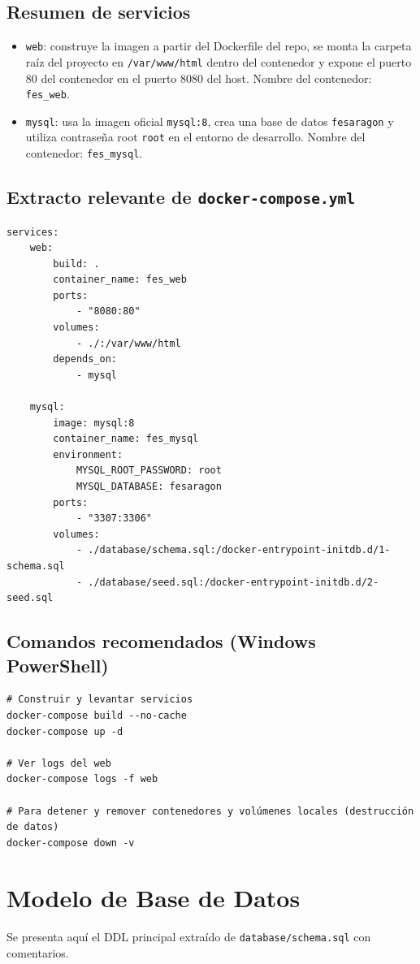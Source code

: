 \documentclass[12pt,letterpaper,oneside]{extreport}
\begin{document}
\section{Resumen de servicios}
\begin{itemize}
    \item \texttt{web}: construye la imagen a partir del Dockerfile del repo, se monta la carpeta raíz del proyecto en \texttt{/var/www/html} dentro del contenedor y expone el puerto 80 del contenedor en el puerto 8080 del host. Nombre del contenedor: \texttt{fes\_web}.
    \item \texttt{mysql}: usa la imagen oficial \texttt{mysql:8}, crea una base de datos \texttt{fesaragon} y utiliza contraseña root \texttt{root} en el entorno de desarrollo. Nombre del contenedor: \texttt{fes\_mysql}.
\end{itemize}
\newpage
\section{Extracto relevante de \texttt{docker-compose.yml}}
\begin{lstlisting}
services:
    web:
        build: .
        container_name: fes_web
        ports:
            - "8080:80"
        volumes:
            - ./:/var/www/html
        depends_on:
            - mysql

    mysql:
        image: mysql:8
        container_name: fes_mysql
        environment:
            MYSQL_ROOT_PASSWORD: root
            MYSQL_DATABASE: fesaragon
        ports:
            - "3307:3306"
        volumes:
            - ./database/schema.sql:/docker-entrypoint-initdb.d/1-schema.sql
            - ./database/seed.sql:/docker-entrypoint-initdb.d/2-seed.sql
\end{lstlisting}

\section{Comandos recomendados (Windows PowerShell)}
\begin{verbatim}
# Construir y levantar servicios
docker-compose build --no-cache
docker-compose up -d

# Ver logs del web
docker-compose logs -f web

# Para detener y remover contenedores y volúmenes locales (destrucción de datos)
docker-compose down -v
\end{verbatim}

\chapter{Modelo de Base de Datos}
Se presenta aquí el DDL principal extraído de \texttt{database/schema.sql} con comentarios.
\end{document}
